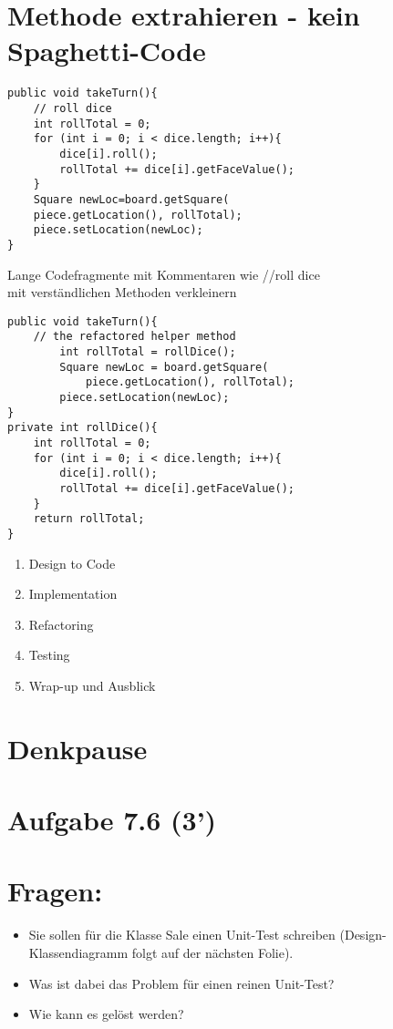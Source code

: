 \documentclass[10pt]{article}
\begin{document}
\section*{Methode extrahieren - kein Spaghetti-Code}
\begin{verbatim}
public void takeTurn(){
    // roll dice
    int rollTotal = 0;
    for (int i = 0; i < dice.length; i++){
        dice[i].roll();
        rollTotal += dice[i].getFaceValue();
    }
    Square newLoc=board.getSquare(
    piece.getLocation(), rollTotal);
    piece.setLocation(newLoc);
}
\end{verbatim}

Lange Codefragmente mit Kommentaren wie //roll dice\\
mit verständlichen Methoden verkleinern

\begin{verbatim}
public void takeTurn(){
    // the refactored helper method
        int rollTotal = rollDice();
        Square newLoc = board.getSquare(
            piece.getLocation(), rollTotal);
        piece.setLocation(newLoc);
}
private int rollDice(){
    int rollTotal = 0;
    for (int i = 0; i < dice.length; i++){
        dice[i].roll();
        rollTotal += dice[i].getFaceValue();
    }
    return rollTotal;
}
\end{verbatim}

\begin{enumerate}
  \item Design to Code
  \item Implementation
  \item Refactoring
  \item Testing
  \item Wrap-up und Ausblick
\end{enumerate}

\section*{Denkpause}
\section*{Aufgabe 7.6 (3’)}
\section*{Fragen:}
\begin{itemize}
  \item Sie sollen für die Klasse Sale einen Unit-Test schreiben (Design-Klassendiagramm folgt auf der nächsten Folie).
  \item Was ist dabei das Problem für einen reinen Unit-Test?
  \item Wie kann es gelöst werden?
\end{itemize}
\end{document}
